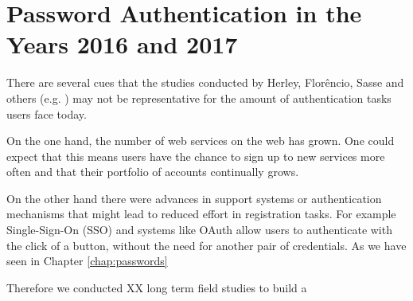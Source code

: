 \chapter[Password Authentication in the Years 2016 and 2017]{Password Authentication in the Years 2016 and 2017}\label{chap:study-auth-tasks}


There are several cues that the studies conducted by Herley, Florêncio, Sasse and others (e.g. \cite{Florencio2007LargeScaleStudyPasswordHabits}) may not be representative for the amount of authentication tasks users face today. 

On the one hand, the number of web services on the web has grown. One could expect that this means users have the chance to sign up to new services more often and that their portfolio of accounts continually grows. 

On the other hand there were advances in support systems or authentication mechanisms that might lead to reduced effort in registration tasks. For example Single-Sign-On (SSO) and systems like OAuth allow users to authenticate with the click of a button, without the need for another pair of credentials. As we have seen in Chapter \ref{chap:passwords}

Therefore we conducted XX long term field studies to build a 